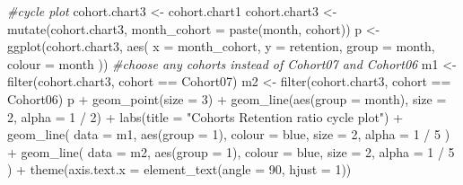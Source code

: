 \documentclass[
]{book}
\newenvironment{Shaded}{\begin{snugshade}}{\end{snugshade}}
\newcommand{\AttributeTok}[1]{\textcolor[rgb]{0.77,0.63,0.00}{#1}}
\newcommand{\CommentTok}[1]{\textcolor[rgb]{0.56,0.35,0.01}{\textit{#1}}}
\newcommand{\DecValTok}[1]{\textcolor[rgb]{0.00,0.00,0.81}{#1}}
\newcommand{\FunctionTok}[1]{\textcolor[rgb]{0.00,0.00,0.00}{#1}}
\newcommand{\NormalTok}[1]{#1}
\newcommand{\OtherTok}[1]{\textcolor[rgb]{0.56,0.35,0.01}{#1}}
\newcommand{\SpecialCharTok}[1]{\textcolor[rgb]{0.00,0.00,0.00}{#1}}
\newcommand{\StringTok}[1]{\textcolor[rgb]{0.31,0.60,0.02}{#1}}
\begin{document}
\begin{Shaded}
\begin{Highlighting}[]
\CommentTok{\#cycle plot}
\NormalTok{cohort.chart3 }\OtherTok{\textless{}{-}}\NormalTok{ cohort.chart1}
\NormalTok{cohort.chart3 }\OtherTok{\textless{}{-}}
    \FunctionTok{mutate}\NormalTok{(cohort.chart3, }\AttributeTok{month\_cohort =} \FunctionTok{paste}\NormalTok{(month, cohort))}
\NormalTok{p }\OtherTok{\textless{}{-}}
    \FunctionTok{ggplot}\NormalTok{(cohort.chart3,}
           \FunctionTok{aes}\NormalTok{(}
               \AttributeTok{x =}\NormalTok{ month\_cohort,}
               \AttributeTok{y =}\NormalTok{ retention,}
               \AttributeTok{group =}\NormalTok{ month,}
               \AttributeTok{colour =}\NormalTok{ month}
\NormalTok{           ))}
\CommentTok{\#choose any cohorts instead of Cohort07 and Cohort06}
\NormalTok{m1 }\OtherTok{\textless{}{-}} \FunctionTok{filter}\NormalTok{(cohort.chart3, cohort }\SpecialCharTok{==} \StringTok{\textquotesingle{}Cohort07\textquotesingle{}}\NormalTok{)}
\NormalTok{m2 }\OtherTok{\textless{}{-}} \FunctionTok{filter}\NormalTok{(cohort.chart3, cohort }\SpecialCharTok{==} \StringTok{\textquotesingle{}Cohort06\textquotesingle{}}\NormalTok{)}
\NormalTok{p }\SpecialCharTok{+} \FunctionTok{geom\_point}\NormalTok{(}\AttributeTok{size =} \DecValTok{3}\NormalTok{) }\SpecialCharTok{+}
    \FunctionTok{geom\_line}\NormalTok{(}\FunctionTok{aes}\NormalTok{(}\AttributeTok{group =}\NormalTok{ month), }\AttributeTok{size =} \DecValTok{2}\NormalTok{, }\AttributeTok{alpha =} \DecValTok{1} \SpecialCharTok{/} \DecValTok{2}\NormalTok{) }\SpecialCharTok{+}
    \FunctionTok{labs}\NormalTok{(}\AttributeTok{title =} \StringTok{"Cohorts Retention ratio cycle plot"}\NormalTok{) }\SpecialCharTok{+}
    \FunctionTok{geom\_line}\NormalTok{(}
        \AttributeTok{data =}\NormalTok{ m1,}
        \FunctionTok{aes}\NormalTok{(}\AttributeTok{group =} \DecValTok{1}\NormalTok{),}
        \AttributeTok{colour =} \StringTok{\textquotesingle{}blue\textquotesingle{}}\NormalTok{,}
        \AttributeTok{size =} \DecValTok{2}\NormalTok{,}
        \AttributeTok{alpha =} \DecValTok{1} \SpecialCharTok{/} \DecValTok{5}
\NormalTok{    ) }\SpecialCharTok{+}
    \FunctionTok{geom\_line}\NormalTok{(}
        \AttributeTok{data =}\NormalTok{ m2,}
        \FunctionTok{aes}\NormalTok{(}\AttributeTok{group =} \DecValTok{1}\NormalTok{),}
        \AttributeTok{colour =} \StringTok{\textquotesingle{}blue\textquotesingle{}}\NormalTok{,}
        \AttributeTok{size =} \DecValTok{2}\NormalTok{,}
        \AttributeTok{alpha =} \DecValTok{1} \SpecialCharTok{/} \DecValTok{5}
\NormalTok{    ) }\SpecialCharTok{+}
    \FunctionTok{theme}\NormalTok{(}\AttributeTok{axis.text.x =} \FunctionTok{element\_text}\NormalTok{(}\AttributeTok{angle =} \DecValTok{90}\NormalTok{, }\AttributeTok{hjust =} \DecValTok{1}\NormalTok{))}
\end{Highlighting}
\end{Shaded}
\end{document}
